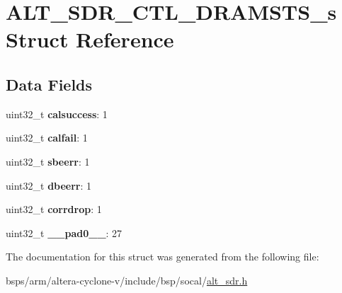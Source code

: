 \hypertarget{structALT__SDR__CTL__DRAMSTS__s}{}\section{A\+L\+T\+\_\+\+S\+D\+R\+\_\+\+C\+T\+L\+\_\+\+D\+R\+A\+M\+S\+T\+S\+\_\+s Struct Reference}
\label{structALT__SDR__CTL__DRAMSTS__s}
\subsection*{Data Fields}
\begin{DoxyCompactItemize}
\item 
\mbox{\label{structALT__SDR__CTL__DRAMSTS__s_a50a37156d45a2f0565ed77da1a292b68}} 
uint32\+\_\+t {\bfseries calsuccess}\+: 1
\item 
\mbox{\label{structALT__SDR__CTL__DRAMSTS__s_a81f74244ea26f297729523cfaa87ada5}} 
uint32\+\_\+t {\bfseries calfail}\+: 1
\item 
\mbox{\label{structALT__SDR__CTL__DRAMSTS__s_ab788fccbb9921ddc354b8d53596d8173}} 
uint32\+\_\+t {\bfseries sbeerr}\+: 1
\item 
\mbox{\label{structALT__SDR__CTL__DRAMSTS__s_ade27da2f79cad75f675043748cedc82a}} 
uint32\+\_\+t {\bfseries dbeerr}\+: 1
\item 
\mbox{\label{structALT__SDR__CTL__DRAMSTS__s_ab403585a72cb4836af45453ceab59182}} 
uint32\+\_\+t {\bfseries corrdrop}\+: 1
\item 
\mbox{\label{structALT__SDR__CTL__DRAMSTS__s_a107cacef41ecb84378eb2a0023c5ff01}} 
uint32\+\_\+t {\bfseries \+\_\+\+\_\+pad0\+\_\+\+\_\+}\+: 27
\end{DoxyCompactItemize}


The documentation for this struct was generated from the following file\+:\begin{DoxyCompactItemize}
\item 
bsps/arm/altera-\/cyclone-\/v/include/bsp/socal/\mbox{\hyperlink{alt__sdr_8h}{alt\+\_\+sdr.\+h}}\end{DoxyCompactItemize}
